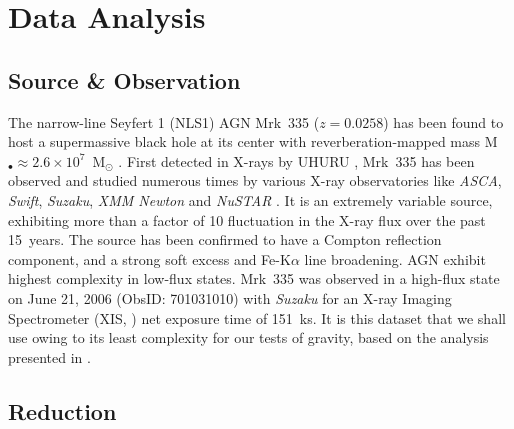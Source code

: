\documentclass[aps,prd,twocolumn,superscriptaddress,nofootinbib,amsmath,amssymb]{revtex4-1}
\begin{document}
\section{\label{analysis}Data Analysis}

\subsection{\label{source}S\lowercase{ource} \& O\lowercase{bservation}}

The narrow-line Seyfert 1 (NLS1) AGN Mrk~335 ($z=0.0258$) has been found to host a supermassive black hole at its center with reverberation-mapped mass M$_{\bullet} \approx 2.6\times10^7$~M$_{\odot}$ \citep{Grier2012}. First detected in X-rays by UHURU \citep{Tanambaum1978}, Mrk~335 has been observed and studied numerous times by various X-ray observatories like \textit{ASCA}, \textit{Swift}, \textit{Suzaku}, \textit{XMM Newton} and \textit{NuSTAR} \citep[e.g.,][]{Ballantyne2001,Gondoin2002,Crummy2006,Grupe2007,Longinotti2007b,
ONeill2007,Larsson2008,Grupe2008,Patrick2011,Grupe2012,Gallo2013,W13,Longinotti2013,Parker2014,
Gallo2015,WG2015,Keek2016,Beheshtipour2017,Ballantyne2017}. It is an extremely variable source, exhibiting more than a factor of 10 fluctuation in the X-ray flux over the past 15~years. The source has been confirmed to have a Compton reflection component, and a strong soft excess and Fe-\textrm{K$\alpha$} line broadening. AGN exhibit highest complexity in low-flux states. Mrk~335 was observed in a high-flux state on June 21, 2006 (ObsID: 701031010) with \textit{Suzaku} \citep{Mitsuda2007} for an X-ray Imaging Spectrometer (XIS, \cite{Koyama2007}) net exposure time of 151~ks. It is this dataset that we shall use owing to its least complexity for our tests of gravity, based on the analysis presented in \cite{W13}.

\subsection{\label{red}R\lowercase{eduction}}
\end{document}
